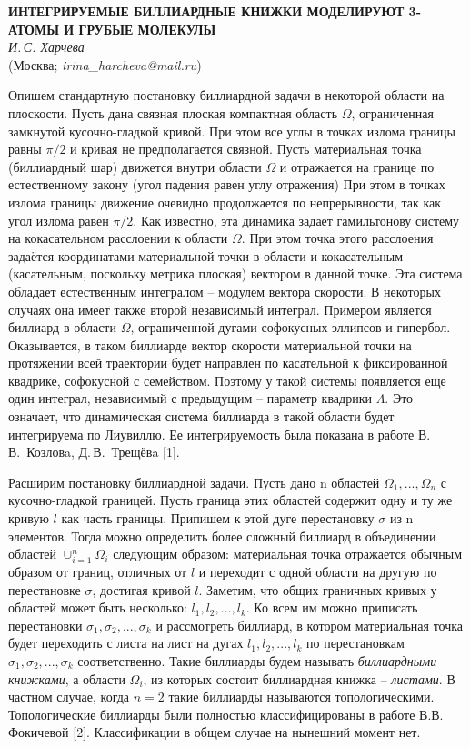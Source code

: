 \begin{center}{ \bf ИНТЕГРИРУЕМЫЕ БИЛЛИАРДНЫЕ КНИЖКИ МОДЕЛИРУЮТ 3-АТОМЫ И ГРУБЫЕ МОЛЕКУЛЫ}\\
{\it И.\,С. Харчева } \\
(Москва; {\it irina\_harcheva@mail.ru})
\end{center}


Опишем стандартную постановку биллиардной задачи в некоторой области на плоскости. Пусть дана связная плоская компактная область $\Omega$, ограниченная замкнутой кусочно-гладкой кривой. При этом все углы в точках излома границы равны $\pi/2$ и кривая не предполагается связной.
Пусть материальная точка (биллиардный шар) движется внутри области $\Omega$ и отражается на границе по естественному закону
(угол падения равен углу отражения) При этом в точках излома границы движение очевидно продолжается по непрерывности, так как угол излома равен $ \pi/2 $.
Как известно, эта динамика задает гамильтонову систему на кокасательном расслоении к области $\Omega$.  При этом точка этого расслоения задаётся координатами материальной точки в области и кокасательным (касательным, поскольку метрика плоская) вектором в данной точке.
Эта система обладает естественным интегралом -- модулем вектора скорости. В некоторых случаях она имеет также
второй независимый интеграл. Примером является биллиард в области $\Omega$, ограниченной дугами софокусных эллипсов и гипербол. Оказывается, в таком биллиарде вектор скорости материальной точки на протяжении всей траектории будет направлен по касательной к фиксированной квадрике, софокусной с семейством. Поэтому у такой системы появляется еще один интеграл, независимый с предыдущим -- параметр квадрики $ \Lambda $. Это означает, что динамическая система биллиарда в такой области будет интегрируема по Лиувиллю. Ее интегрируемость была показана в работе В.\,В.~Козловa, Д.\,В.~Трещёвa [1].

Расширим постановку биллиардной задачи. Пусть дано n областей $\Omega_1, ... ,\Omega_n$ с кусочно-гладкой границей.
Пусть граница этих областей содержит одну и ту же кривую $l$ как часть границы. Припишем к этой дуге перестановку $ \sigma $ из n элементов. Тогда можно определить более сложный биллиард в объединении областей $\cup_{i = 1}^n \Omega_i$ следующим образом: материальная точка отражается обычным образом от границ, отличных от $l$ и переходит с одной области на другую по перестановке $ \sigma $, достигая кривой $l$. Заметим, что общих граничных кривых у областей может быть несколько: $ l_1, l_2, ..., l_k $. Ко всем им можно приписать перестановки $ \sigma_1, \sigma_2, ..., \sigma_k $  и рассмотреть биллиард, в котором материальная точка будет переходить с листа на лист на дугах $ l_1, l_2, ..., l_k $ по перестановкам $ \sigma_1, \sigma_2, ..., \sigma_k $ соответственно. Такие биллиарды будем называть \textit{биллиардными книжками}, а области $ \Omega_i $,  из которых состоит биллиардная книжка -- \textit{листами}. В частном случае, когда $ n = 2 $ такие биллиарды называются топологическими. Топологические биллиарды были полностью классифицированы в работе В.В.\,Фокичевой [2]. Классификации в общем случае на нынешний момент нет.

